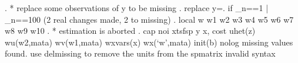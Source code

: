 . * replace some observations of y to be missing
. replace y=. if _n==1 | _n==100
(2 real changes made, 2 to missing)
{\smallskip}
. local w w1 w2 w3 w4 w5 w6 w7 w8 w9 w10
{\smallskip}
. * estimation is aborted
. cap noi xtsfsp y x, cost uhet(z) wu(w2,mata) wv(w1,mata) wxvars(x) wx(`w',mata) init(b) nolog
missing values found. use delmissing to remove the units from the spmatrix
invalid syntax
{\smallskip}
